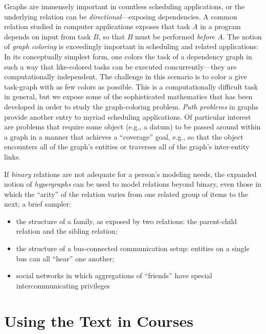Graphs are immensely important in countless scheduling applications, or the underlying relation can be {\em directional}---exposing dependencies.  A common relation studied in computer applications exposes that task $A$ in a program depends on input from task $B$, so that $B$ must be performed {\em before $A$}.  The notion of {\it graph coloring} is exceedingly important in scheduling and related applications: In its conceptually simplest form, one colors the task of a dependency graph in such a way that like-colored tasks can be executed concurrently---they are computationally independent.  The challenge in this scenario is to color a give task-graph with as few colors as possible.  This is a computationally difficult task in general, but we expose some of the sophisticated mathematics that has been developed in order to study the graph-coloring problem.  {\em Path problems} in graphs provide another entry to myriad scheduling applications.  Of particular interest are problems that require some object (e.g., a datum) to be passed around within a graph in a manner that achieves a ``coverage'' goal, e.g., so that the object encounters
all of the graph's entities or traverses all of the graph's inter-entity links.

\medskip

If {\em binary} relations are not adequate for a person's modeling needs, the expanded notion of {\em hypergraphs} can be used to model relations beyond binary, even those in which the ``arity'' of the relation varies from one related group of items to the next; a brief sampler:
\begin{itemize}
\item
the structure of a family, as exposed by two relations: the parent-child relation and the sibling relation;
\medskip\item
the structure of a bus-connected communication setup: entities on a single bus can all ``hear'' one another;
\medskip\item
social networks in which aggregations of ``friends'' have special intercommunicating privileges
\end{itemize}


\section{Using the Text in Courses}
\label{sec:how-to-use}

